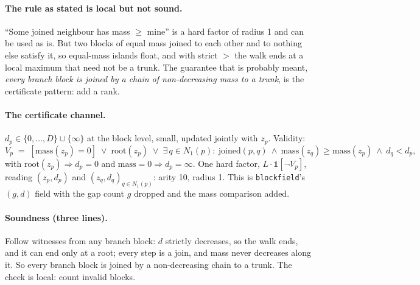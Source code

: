 \documentclass[11pt]{article}
\newcommand{\1}{\mathds{1}}
\begin{document}
\paragraph{The rule as stated is local but not sound.} ``Some joined neighbour has
mass $\ge$ mine'' is a hard factor of radius 1 and can be used as is. But two
blocks of equal mass joined to each other and to nothing else satisfy it, so
equal-mass islands float, and with strict $>$ the walk ends at a local maximum
that need not be a trunk. The guarantee that is probably meant, \emph{every branch
block is joined by a chain of non-decreasing mass to a trunk}, is the
certificate pattern: add a rank.

\paragraph{The certificate channel.} $d_p \in \{0, \dots, D\} \cup \{\infty\}$ at the
block level, small, updated jointly with $z_p$. Validity:
\[
  V_p \;=\; [\mathrm{mass}(z_p) = 0] \;\lor\; \mathrm{root}(z_p) \;\lor\;
  \exists\, q \in N_1(p):\ \mathrm{joined}(p,q)\ \land\ \mathrm{mass}(z_q) \ge \mathrm{mass}(z_p)\ \land\ d_q < d_p ,
\]
with $\mathrm{root}(z_p) \Rightarrow d_p = 0$ and $\mathrm{mass} = 0 \Rightarrow d_p = \infty$. One hard
factor, $L \cdot \1[\lnot V_p]$, reading $(z_p, d_p)$ and $(z_q, d_q)_{q \in N_1(p)}$:
arity 10, radius 1. This is \texttt{blockfield}'s $(g, d)$ field with the gap
count $g$ dropped and the mass comparison added.

\paragraph{Soundness (three lines).} Follow witnesses from any branch block:
$d$ strictly decreases, so the walk ends, and it can end only at a root; every
step is a join, and mass never decreases along it. So every branch block is
joined by a non-decreasing chain to a trunk. The check is local: count invalid
blocks.
\end{document}
